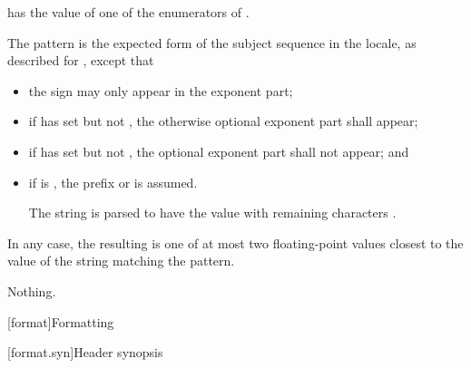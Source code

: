 \begin{itemdescr}
\pnum
\expects
{} has the value of
one of the enumerators of .

\pnum
\effects
The pattern is the expected form of the subject sequence
in the  locale,
as described for ,
except that
\begin{itemize}
\item
the sign  may only appear in the exponent part;
\item
if  has  set
but not ,
the otherwise optional exponent part shall appear;
\item
if  has  set
but not ,
the optional exponent part shall not appear; and
\item
if  is ,
the prefix  or  is assumed.
\begin{example}
The string 
is parsed to have the value
with remaining characters .
\end{example}
\end{itemize}
In any case, the resulting  is one of
at most two floating-point values
closest to the value of the string matching the pattern.

\pnum
\throws
Nothing.
\end{itemdescr}


[format]{Formatting}

[format.syn]{Header  synopsis}

